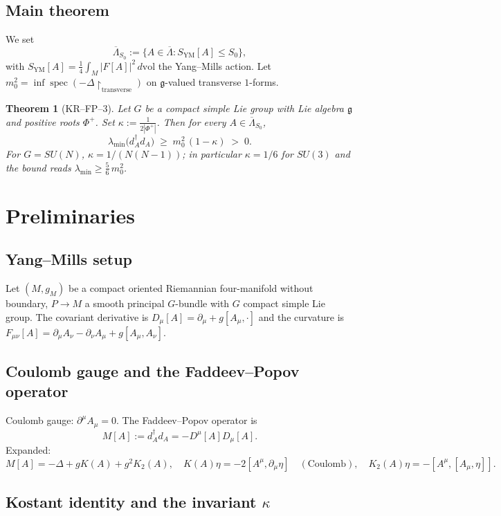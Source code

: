\documentclass[11pt,a4paper]{amsart}
\newtheorem{theorem}{Theorem}[section]
\theoremstyle{definition}
\newcommand{\g}{\mathfrak{g}}
\newcommand{\dvol}{\, d\mathrm{vol}}
\DeclareMathOperator{\spec}{spec}
\begin{document}
\subsection{Main theorem}
We set
\[
  \overline\Lambda_{S_0} := \bigl\{A \in \overline\Lambda : S_{\mathrm{YM}}[A] \leq S_0\bigr\},
\]
with $S_{\mathrm{YM}}[A] = \tfrac{1}{4}\int_M |F[A]|^2 \dvol$ the Yang--Mills action. Let $m_0^2 = \inf\spec(-\Delta\restriction_{\mathrm{transverse}})$ on $\g$-valued transverse $1$-forms.

\begin{theorem}[KR--FP--3]\label{thm:KRFP3}
Let $G$ be a compact simple Lie group with Lie algebra $\g$ and positive roots $\Phi^+$. Set $\kappa := \tfrac{1}{2|\Phi^+|}$. Then for every $A \in \overline\Lambda_{S_0}$,
\[
  \lambda_{\min}\bigl(d_A^\dagger d_A\bigr) \;\geq\; m_0^{2}\,(1-\kappa) \;>\; 0.
\]
For $G = SU(N)$, $\kappa = 1/(N(N-1))$; in particular $\kappa = 1/6$ for $SU(3)$ and the bound reads $\lambda_{\min} \geq \tfrac{5}{6}\, m_0^2$.
\end{theorem}

\section{Preliminaries}\label{sec:prelim}

\subsection{Yang--Mills setup}
Let $(M, g_M)$ be a compact oriented Riemannian four-manifold without boundary, $P \to M$ a smooth principal $G$-bundle with $G$ compact simple Lie group. The covariant derivative is $D_\mu[A] = \partial_\mu + g[A_\mu, \cdot]$ and the curvature is $F_{\mu\nu}[A] = \partial_\mu A_\nu - \partial_\nu A_\mu + g[A_\mu, A_\nu]$.

\subsection{Coulomb gauge and the Faddeev--Popov operator}
Coulomb gauge: $\partial^\mu A_\mu = 0$. The Faddeev--Popov operator is
\[
  M[A] := d_A^\dagger d_A = -D^\mu[A] D_\mu[A].
\]
Expanded:
\[
  M[A] = -\Delta + g K(A) + g^2 K_2(A), \quad
  K(A)\eta = -2 [A^\mu, \partial_\mu \eta] \quad (\text{Coulomb}), \quad K_2(A)\eta = -[A^\mu, [A_\mu, \eta]].
\]

\subsection{Kostant identity and the invariant $\kappa$}
\end{document}
